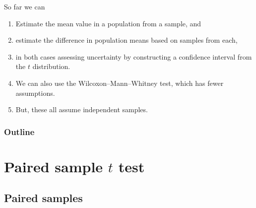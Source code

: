 %
%
%



\subtitle{and the sign test}

\date{27 October 2015}






\begin{frame}
  \maketitle
\end{frame}


\begin{frame}{So far we can}
  \begin{enumerate}
  \item Estimate the mean value in a population from a sample, and
  \item estimate the difference in population means based on samples from each,
  \item in both cases assessing uncertainty by constructing a confidence interval from the $t$ distribution.
  \item We can also use the Wilcoxon--Mann--Whitney test, which has fewer assumptions.
  \item But, these all assume \alert{independent samples}.
  \end{enumerate}
\end{frame}

\begin{frame}\frametitle<presentation>{Outline}
  \tableofcontents
\end{frame}

\section{Paired sample $t$ test}

\subsection{Paired samples}

